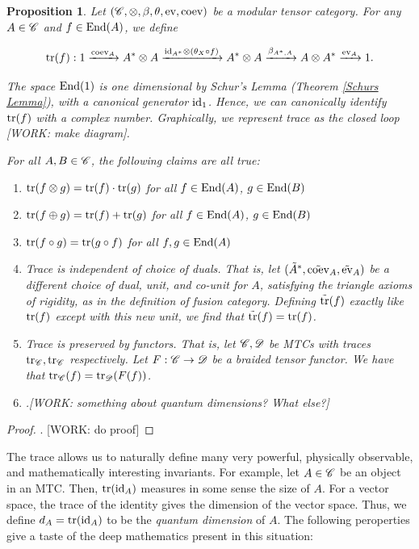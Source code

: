 \documentclass{article}
\newtheorem{proposition}{Proposition}[section]
\theoremstyle{definition}
\numberwithin{figure}{section}
\begin{document}
\begin{proposition}\label{trace} Let $(\mathscr{C},\otimes, \beta, \theta, \mathrm{ev},\mathrm{coev})$ be a modular tensor category. For any $A\in \mathscr{C}$ and $f\in \mathrm{End}(A)$, we define

$$\mathrm{tr}(f): 1\xrightarrow{\mathrm{coev}_A} A^*\otimes A\xrightarrow{\mathrm{id}_{A^*}\otimes (\theta_X\circ f)} A^*\otimes A \xrightarrow{\beta_{A^*,A}}A\otimes A^*\xrightarrow{\mathrm{ev}_A}1.$$

The space $\mathrm{End}(1)$ is one dimensional by Schur's Lemma (Theorem \ref{Schurs Lemma}), with a canonical generator $\mathrm{id}_1$. Hence, we can canonically identify $\mathrm{tr}(f)$ with a complex number. Graphically, we represent trace as the closed loop [WORK: make diagram].

For all $A,B\in \mathscr{C}$, the following claims are all true:

\begin{enumerate}
\item $\mathrm{tr}(f\otimes g)=\mathrm{tr}(f)\cdot \mathrm{tr}(g)$ for all $f\in \mathrm{End}(A)$, $g\in \mathrm{End}(B)$
\item $\mathrm{tr}(f\oplus g)=\mathrm{tr}(f)+\mathrm{tr}(g)$ for all $f\in \mathrm{End}(A)$, $g\in \mathrm{End}(B)$
\item $\mathrm{tr}(f\circ g)=\mathrm{tr}(g\circ f)$ for all $f,g\in \mathrm{End}(A)$
\item Trace is independent of choice of duals. That is, let $(\tilde{A}^*,\tilde{\mathrm{coev}}_{A}, \tilde{\mathrm{ev}}_A)$ be a different choice of dual, unit, and co-unit for $A$, satisfying the triangle axioms of rigidity, as in the definition of fusion category. Defining $\tilde{\mathrm{tr}}(f)$ exactly like $\mathrm{tr}(f)$ except with this new unit, we find that $\tilde{\mathrm{tr}}(f)=\mathrm{tr}(f)$.
\item Trace is preserved by functors. That is, let $\mathscr{C},\mathscr{D}$ be MTCs with traces $\mathrm{tr}_{\mathscr{C}},\mathrm{tr}_{\mathscr{C}}$ respectively. Let $F:\mathscr{C}\to \mathscr{D}$ be a braided tensor functor. We have that $\mathrm{tr}_{\mathscr{C}}(f)=\mathrm{tr}_{\mathscr{D}}(F(f))$.
\item .[WORK: something about quantum dimensions? What else?]
\end{enumerate}
\end{proposition}
\begin{proof}. [WORK: do proof]
\end{proof}

The trace allows us to naturally define many very powerful, physically observable, and mathematically interesting invariants. For example, let $A\in \mathscr{C}$ be an object in an MTC. Then, $\mathrm{tr}(\mathrm{id}_A)$ measures in some sense the size of $A$. For a vector space, the trace of the identity gives the dimension of the vector space. Thus, we define $d_A=\mathrm{tr}(\mathrm{id}_A)$ to be the \textit{quantum dimension} of $A$. The following peroperties give a taste of the deep mathematics present in this situation:
\end{document}
